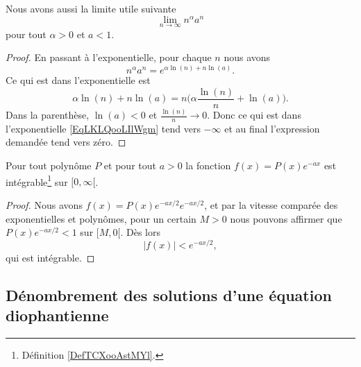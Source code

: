 \begin{lemma}       \label{LemVKDKooEftNzG}
    Nous avons aussi la limite utile suivante 
    \begin{equation}
        \lim_{n\to \infty} n^{\alpha}a^n
    \end{equation}
    pour tout \( \alpha>0\) et \( a<1\).
\end{lemma}

\begin{proof}
    En passant à l'exponentielle, pour chaque \( n\) nous avons
    \begin{equation}        \label{EqLKLQooLIlWgm}
        n^{\alpha}a^n= e^{\alpha\ln(n)+n\ln(a)}.
    \end{equation}
    Ce qui est dans l'exponentielle est
    \begin{equation}
        \alpha\ln(n)+n\ln(a)=n\big(\alpha \frac{ \ln(n) }{ n }+\ln(a) \big).
    \end{equation}
    Dans la parenthèse, \( \ln(a)<0\) et \( \frac{ \ln(n) }{ n }\to 0\). Donc ce qui est dans l'exponentielle \eqref{EqLKLQooLIlWgm} tend vers \( -\infty\) et au final l'expression demandée tend vers zéro.
\end{proof}

\begin{proposition} \label{PropBQGBooHxNrrf}
    Pour tout polynôme \( P\) et pour tout \( a>0\) la fonction \( f(x)=P(x) e^{-ax}\) est intégrable\footnote{Définition \ref{DefTCXooAstMYl}.} sur \( \mathopen[ 0 , \infty [\).
\end{proposition}

\begin{proof}
    Nous avons \( f(x)=P(x) e^{-ax/2} e^{-ax/2}\), et par la vitesse comparée des exponentielles et polynômes, pour un certain \( M>0\) nous pouvons affirmer que \( P(x) e^{-ax/2}<1\) sur \( \mathopen[ M , 0 [\). Dès lors
        \begin{equation}
            | f(x) |< e^{-ax/2},
        \end{equation}
        qui est intégrable.
\end{proof}


\subsection{Dénombrement des solutions d'une équation diophantienne}

